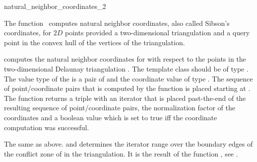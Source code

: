 
\begin{ccRefFunction}{natural_neighbor_coordinates_2}

\ccDefinition
  
The function \ccRefName\ computes natural neighbor coordinates, also
called Sibson's coordinates, for $2D$ points provided a two-dimensional
triangulation and a query point in the convex hull of the vertices
of the triangulation.



 { computes the
  natural neighbor coordinates for  with respect to the points
  in the two-dimensional Delaunay triangulation .  The
  template class  should be of type
  .  The value type of the
   is a pair of  and the
  coordinate value of type . The sequence of
  point/coordinate pairs that is computed by the function is placed
  starting at . The function returns a triple with an
  iterator that is placed past-the-end of the resulting sequence of
  point/coordinate pairs, the normalization factor of the coordinates
  and a boolean value which is set to true iff the coordinate
  computation was successful.  }

 { The same as above.
   and  determines the iterator range
  over the boundary edges of the conflict zone of  in the
  triangulation. It is the result of the function
  , see .}


\end{ccRefFunction}
